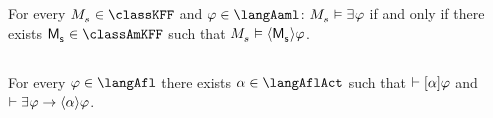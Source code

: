 \begin{corollary}
For every $\kPModel{\kStateS} \in \classKFF$ and $\phi \in \langAaml$: $\kPModel{\kStateS} \entails \somerefs \phi$ if and only if there exists $\aPModel{\aStateS} \in \classAmKFF$ such that $\kPModel{\kStateS} \entails \actionE{\aPModel{\aStateS}} \phi$.
\end{corollary}

\subsection{\classS{}}

\begin{proposition}\label{afl-s-synthesis}
For every $\phi \in \langAfl$ there exists $\alpha \in \langAflAct$ such that $\vdash {[ {\alpha} ]} \varphi$ and $\proves \somerefs \phi \implies \actionE{\alpha} \phi$.
\end{proposition}

